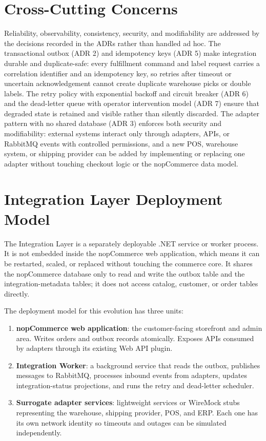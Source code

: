 \section{Cross-Cutting Concerns}

Reliability, observability, consistency, security, and modifiability are addressed by the
decisions recorded in the ADRs rather than handled ad hoc. The transactional outbox (ADR 2)
and idempotency keys (ADR 5) make integration durable and duplicate-safe: every fulfillment
command and label request carries a correlation identifier and an idempotency key, so retries
after timeout or uncertain acknowledgement cannot create duplicate warehouse picks or double
labels. The retry policy with exponential backoff and circuit breaker (ADR 6) and the
dead-letter queue with operator intervention model (ADR 7) ensure that degraded state is
retained and visible rather than silently discarded. The adapter pattern with no shared
database (ADR 3) enforces both security and modifiability: external systems interact only
through adapters, APIs, or RabbitMQ events with controlled permissions, and a new POS,
warehouse system, or shipping provider can be added by implementing or replacing one adapter
without touching checkout logic or the nopCommerce data model.

\section{Integration Layer Deployment Model}

The Integration Layer is a separately deployable .NET service or worker process. It is not
embedded inside the nopCommerce web application, which means it can be restarted, scaled, or
replaced without touching the commerce core. It shares the nopCommerce database only to read
and write the outbox table and the integration-metadata tables; it does not access catalog,
customer, or order tables directly.

The deployment model for this evolution has three units:

\begin{enumerate}
    \item \textbf{nopCommerce web application}: the customer-facing storefront and admin
    area. Writes orders and outbox records atomically. Exposes APIs consumed by adapters
    through its existing Web API plugin.
    \item \textbf{Integration Worker}: a background service that reads the outbox, publishes
    messages to RabbitMQ, processes inbound events from adapters, updates integration-status
    projections, and runs the retry and dead-letter scheduler.
    \item \textbf{Surrogate adapter services}: lightweight services or WireMock stubs
    representing the warehouse, shipping provider, POS, and ERP. Each one has its own network
    identity so timeouts and outages can be simulated independently.
\end{enumerate}


